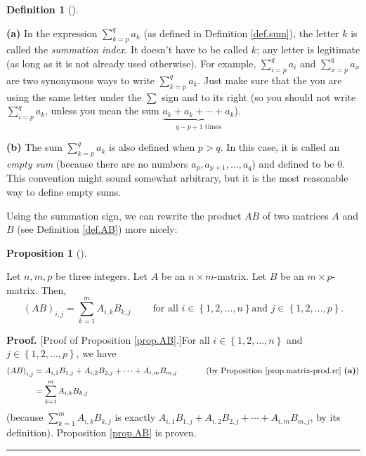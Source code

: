 \documentclass[numbers=enddot,12pt,final,onecolumn,notitlepage]{scrartcl}%
\theoremstyle{definition}
\newtheorem{prop}[theo]{Proposition}
\newenvironment{proposition}[1][]
{\begin{prop}[#1]\begin{leftbar}}
{\end{leftbar}\end{prop}}
\newtheorem{defi}[theo]{Definition}
\newenvironment{definition}[1][]
{\begin{defi}[#1]\begin{leftbar}}
{\end{leftbar}\end{defi}}
\newenvironment{proof}[1][Proof]{\noindent\textbf{#1.} }{\ \rule{0.5em}{0.5em}}
\let\sumnonlimits\sum
\renewcommand{\sum}{\sumnonlimits\limits}
\begin{document}
\begin{definition}
\label{def.sum.2}\textbf{(a)} In the expression $\sum_{k=p}^{q}a_{k}$ (as
defined in Definition \ref{def.sum}), the letter $k$ is called the
\textit{summation index}. It doesn't have to be called $k$; any letter is
legitimate (as long as it is not already used otherwise). For example,
$\sum_{i=p}^{q}a_{i}$ and $\sum_{x=p}^{q}a_{x}$ are two synonymous ways to
write $\sum_{k=p}^{q}a_{k}$. Just make sure that the you are using the same
letter under the $\sum$ sign and to its right (so you should not write
$\sum_{i=p}^{q}a_{k}$, unless you mean the sum $\underbrace{a_{k}+a_{k}%
+\cdots+a_{k}}_{q-p+1\text{ times}}$).

\textbf{(b)} The sum $\sum_{k=p}^{q}a_{k}$ is also defined when $p>q$. In this
case, it is called an \textit{empty sum} (because there are no numbers
$a_{p},a_{p+1},\ldots,a_{q}$) and defined to be $0$. This convention might
sound somewhat arbitrary, but it is the most reasonable way to define empty sums.
\end{definition}

Using the summation sign, we can rewrite the product $AB$ of two matrices $A$
and $B$ (see Definition \ref{def.AB}) more nicely:

\begin{proposition}
\label{prop.AB}Let $n,m,p$ be three integers. Let $A$ be an $n\times
m$-matrix. Let $B$ be an $m\times p$-matrix. Then,%
\[
\left(  AB\right)  _{i,j}=\sum_{k=1}^{m}A_{i,k}B_{k,j}%
\ \ \ \ \ \ \ \ \ \ \text{for all }i\in\left\{  1,2,\ldots,n\right\}  \text{
and }j\in\left\{  1,2,\ldots,p\right\}  .
\]

\end{proposition}

\begin{proof}
[Proof of Proposition \ref{prop.AB}.]For all $i\in\left\{  1,2,\ldots
,n\right\}  $ and $j\in\left\{  1,2,\ldots,p\right\}  $, we have%
\begin{align*}
\left(  AB\right)  _{i,j}  &  =A_{i,1}B_{1,j}+A_{i,2}B_{2,j}+\cdots
+A_{i,m}B_{m,j}\ \ \ \ \ \ \ \ \ \ \left(  \text{by Proposition
\ref{prop.matrix-prod.rc} \textbf{(a)}}\right) \\
&  =\sum_{k=1}^{m}A_{i,k}B_{k,j}%
\end{align*}
(because $\sum_{k=1}^{m}A_{i,k}B_{k,j}$ is exactly $A_{i,1}B_{1,j}%
+A_{i,2}B_{2,j}+\cdots+A_{i,m}B_{m,j}$, by its definition). Proposition
\ref{prop.AB} is proven.
\end{proof}
\end{document}
